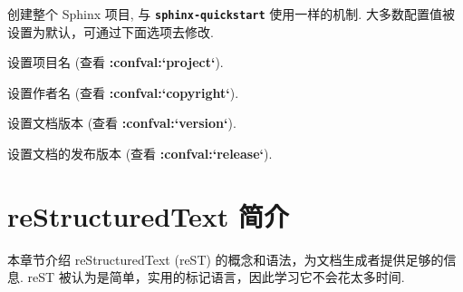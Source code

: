 \documentclass[letterpaper,10pt,english]{sphinxmanual}
\begin{document}
\begin{fulllineitems}
\label{invocation:cmdoption-sphinx-apidoc-F}
创建整个 Sphinx 项目, 与 \textbf{\texttt{sphinx-quickstart}} 使用一样的机制.
大多数配置值被设置为默认，可通过下面选项去修改.

\end{fulllineitems}


\begin{fulllineitems}
\label{invocation:cmdoption-sphinx-apidoc-H}
设置项目名 (查看 {\color{red}\bfseries{}:confval:{}`project{}`}).

\end{fulllineitems}


\begin{fulllineitems}
\label{invocation:cmdoption-sphinx-apidoc-A}
设置作者名 (查看 {\color{red}\bfseries{}:confval:{}`copyright{}`}).

\end{fulllineitems}


\begin{fulllineitems}
\label{invocation:cmdoption-sphinx-apidoc-V}
设置文档版本 (查看 {\color{red}\bfseries{}:confval:{}`version{}`}).

\end{fulllineitems}


\begin{fulllineitems}
\label{invocation:cmdoption-sphinx-apidoc-R}
设置文档的发布版本 (查看 {\color{red}\bfseries{}:confval:{}`release{}`}).

\end{fulllineitems}



\chapter{reStructuredText 简介}
\label{rest::doc}\label{rest:restructuredtext}\label{rest:rst-primer}
本章节介绍 reStructuredText (reST) 的概念和语法，为文档生成者提供足够的信息.
reST 被认为是简单，实用的标记语言，因此学习它不会花太多时间.
\end{document}
